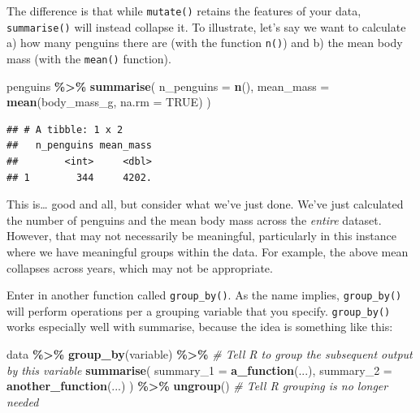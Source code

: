 \documentclass[
]{book}
\newenvironment{Shaded}{\begin{snugshade}}{\end{snugshade}}
\newcommand{\AttributeTok}[1]{\textcolor[rgb]{0.13,0.29,0.53}{#1}}
\newcommand{\CommentTok}[1]{\textcolor[rgb]{0.56,0.35,0.01}{\textit{#1}}}
\newcommand{\ConstantTok}[1]{\textcolor[rgb]{0.56,0.35,0.01}{#1}}
\newcommand{\FunctionTok}[1]{\textcolor[rgb]{0.13,0.29,0.53}{\textbf{#1}}}
\newcommand{\NormalTok}[1]{#1}
\newcommand{\SpecialCharTok}[1]{\textcolor[rgb]{0.81,0.36,0.00}{\textbf{#1}}}
\begin{document}
The difference is that while \texttt{mutate()} retains the features of your data, \texttt{summarise()} will instead collapse it. To illustrate, let's say we want to calculate a) how many penguins there are (with the function \texttt{n()}) and b) the mean body mass (with the \texttt{mean()} function).

\begin{Shaded}
\begin{Highlighting}[]
\NormalTok{penguins }\SpecialCharTok{\%\textgreater{}\%}
  \FunctionTok{summarise}\NormalTok{(}
    \AttributeTok{n\_penguins =} \FunctionTok{n}\NormalTok{(),}
    \AttributeTok{mean\_mass =} \FunctionTok{mean}\NormalTok{(body\_mass\_g, }\AttributeTok{na.rm =} \ConstantTok{TRUE}\NormalTok{)}
\NormalTok{  )}
\end{Highlighting}
\end{Shaded}

\begin{verbatim}
## # A tibble: 1 x 2
##   n_penguins mean_mass
##        <int>     <dbl>
## 1        344     4202.
\end{verbatim}

This is\ldots{} good and all, but consider what we've just done. We've just calculated the number of penguins and the mean body mass across the \emph{entire} dataset. However, that may not necessarily be meaningful, particularly in this instance where we have meaningful groups within the data. For example, the above mean collapses across years, which may not be appropriate.

Enter in another function called \texttt{group\_by()}. As the name implies, \texttt{group\_by()} will perform operations per a grouping variable that you specify. \texttt{group\_by()} works especially well with summarise, because the idea is something like this:

\begin{Shaded}
\begin{Highlighting}[]
\NormalTok{data }\SpecialCharTok{\%\textgreater{}\%}
  \FunctionTok{group\_by}\NormalTok{(variable) }\SpecialCharTok{\%\textgreater{}\%}                 \CommentTok{\# Tell R to group the subsequent output by this variable}
  \FunctionTok{summarise}\NormalTok{(}
    \AttributeTok{summary\_1 =} \FunctionTok{a\_function}\NormalTok{(...),}
    \AttributeTok{summary\_2 =} \FunctionTok{another\_function}\NormalTok{(...)}
\NormalTok{    ) }\SpecialCharTok{\%\textgreater{}\%}
  \FunctionTok{ungroup}\NormalTok{()         }\CommentTok{\# Tell R grouping is no longer needed}
\end{Highlighting}
\end{Shaded}
\end{document}
